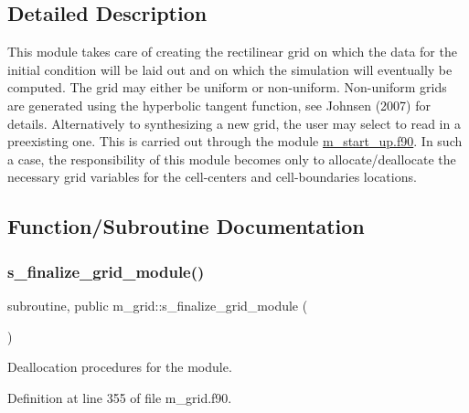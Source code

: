 \subsection{Detailed Description}
This module takes care of creating the rectilinear grid on which the data for the initial condition will be laid out and on which the simulation will eventually be computed. The grid may either be uniform or non-\/uniform. Non-\/uniform grids are generated using the hyperbolic tangent function, see Johnsen (2007) for details. Alternatively to synthesizing a new grid, the user may select to read in a preexisting one. This is carried out through the module \hyperlink{m__start__up_8f90}{m\+\_\+start\+\_\+up.\+f90}. In such a case, the responsibility of this module becomes only to allocate/deallocate the necessary grid variables for the cell-\/centers and cell-\/boundaries locations. 

\subsection{Function/\+Subroutine Documentation}
\mbox{\label{namespacem__grid_a128e8c4d55df21039d945edda39205aa}} 
\subsubsection{\texorpdfstring{s\+\_\+finalize\+\_\+grid\+\_\+module()}{s\_finalize\_grid\_module()}}
{\footnotesize\ttfamily subroutine, public m\+\_\+grid\+::s\+\_\+finalize\+\_\+grid\+\_\+module (\begin{DoxyParamCaption}{ }\end{DoxyParamCaption})}



Deallocation procedures for the module. 



Definition at line 355 of file m\+\_\+grid.\+f90.

\mbox{\label{namespacem__grid_abcc7c446abd0c768e42b2a2f7323a2d7}} 

